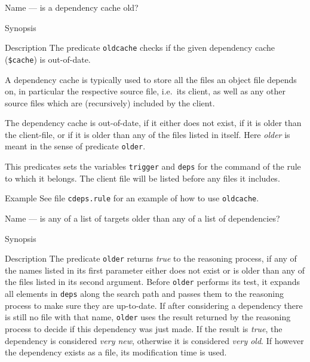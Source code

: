 \documentclass[11pt]{scrartcl}
\begin{document}
\begin{Describe}
\item[Name]  --- is a dependency cache old?
\item[Synopsis]  
\item[Description] The predicate \texttt{oldcache} checks if the given
  dependency cache (\texttt{\$cache}) is out-of-date. 
  
  A dependency cache is typically used to store all the files an
  object file depends on, in particular the respective source file,
  i.e.\ its client, as well as any other source files which are
  (recursively) included by the client.
  
  The dependency cache is out-of-date, if it either does not exist, if
  it is older than the client-file, or if it is older than any of the
  files listed in itself. Here \textit{older} is meant in the sense of 
  predicate \texttt{older}. 

  This predicates sets the variables \texttt{trigger} and
  \texttt{deps} for the command of the rule to which it belongs. The
  client file will be listed before any files it includes.
\item[Example] See file \texttt{cdeps.rule} for an example of how to use 
  \texttt{oldcache}.
\end{Describe}
\begin{Describe}
\item[Name]  --- is any of a list of targets older than
  any of a list of dependencies?
\item[Synopsis]  
\item[Description] The predicate \texttt{older} returns \textit{true}
  to the reasoning process, if any of the names listed in its first
  parameter either does not exist or is older than any of the files
  listed in its second argument. Before \texttt{older} performs its
  test, it expands all elements in \texttt{deps} along the search path
  and passes them to the reasoning process to make sure they are
  up-to-date. If after considering a dependency there is still no file
  with that name, \texttt{older} uses the result returned by the
  reasoning process to decide if this dependency was just made. If the
  result is \textit{true}, the dependency is considered \textit{very
    new}, otherwise it is considered \textit{very old}. If however the
  dependency exists as a file, its modification time is used.
\end{Describe}
\end{document}
